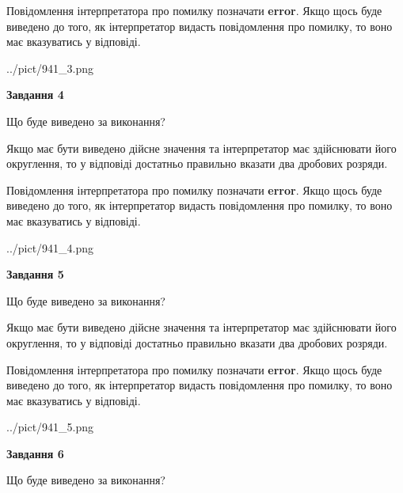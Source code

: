 \documentclass[12pt, ukrainian]{article}
\begin{document}
{\begin {Large}
Повідомлення інтерпретатора про помилку позначати \textbf{error}.
Якщо щось буде виведено до того, як інтерпретатор видасть повідомлення про помилку, 
то воно має вказуватись у відповіді. \par

\begin{center}
	{../pict/941_3.png}
\end{center}
\newpage

{\begin {center}\textbf{Завдання 4}\end {center}}\par
Що буде виведено за виконання? \par

Якщо має бути виведено дійсне значення та інтерпретатор має здійснювати його округлення, 
то у відповіді достатньо правильно вказати два дробових розряди.

Повідомлення інтерпретатора про помилку позначати \textbf{error}.
Якщо щось буде виведено до того, як інтерпретатор видасть повідомлення про помилку, 
то воно має вказуватись у відповіді. \par

\begin{center}
	{../pict/941_4.png}
\end{center}
\newpage

{\begin {center}\textbf{Завдання 5}\end {center}}\par
Що буде виведено за виконання? \par

Якщо має бути виведено дійсне значення та інтерпретатор має здійснювати його округлення, 
то у відповіді достатньо правильно вказати два дробових розряди.

Повідомлення інтерпретатора про помилку позначати \textbf{error}.
Якщо щось буде виведено до того, як інтерпретатор видасть повідомлення про помилку, 
то воно має вказуватись у відповіді. \par

\begin{center}
	{../pict/941_5.png}
\end{center}
\newpage

{\begin {center}\textbf{Завдання 6}\end {center}}\par
Що буде виведено за виконання? \par


\end{Large}}
\end{document}
